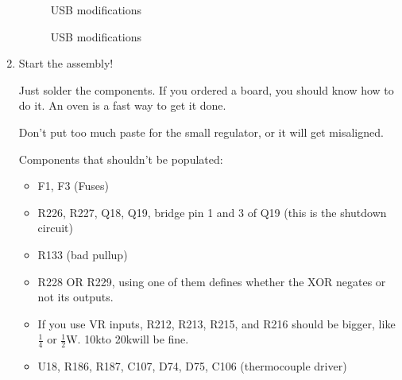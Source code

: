 \documentclass[12pt,a4paper,titlepage]{article}
\begin{document}
\begin{enumerate}
\begin{figure}[H]
  \caption{USB modifications}
\end{figure}
\begin{figure}[H]
  \centering
  \caption{USB modifications}
\end{figure}

\item Start the assembly!

Just solder the components. If you ordered a board, you should know how to do it. An oven is a fast way to get it done.

Don't put too much paste for the small regulator, or it will get misaligned.

Components that shouldn't be populated:

\begin{itemize}
\item F1, F3 (Fuses)
\item R226, R227, Q18, Q19, bridge pin 1 and 3 of Q19 (this is the shutdown circuit)
\item R133 (bad pullup)
\item R228 OR R229, using one of them defines whether the XOR negates or not its outputs.
\item If you use VR inputs, R212, R213, R215, and R216 should be bigger, like $\frac{1}{4}$ or $\frac{1}{2}$W. 10k\ohm to 20k\ohm will be fine.
\item U18, R186, R187, C107, D74, D75, C106 (thermocouple driver)
\end{itemize}


\end{enumerate}
\end{document}
